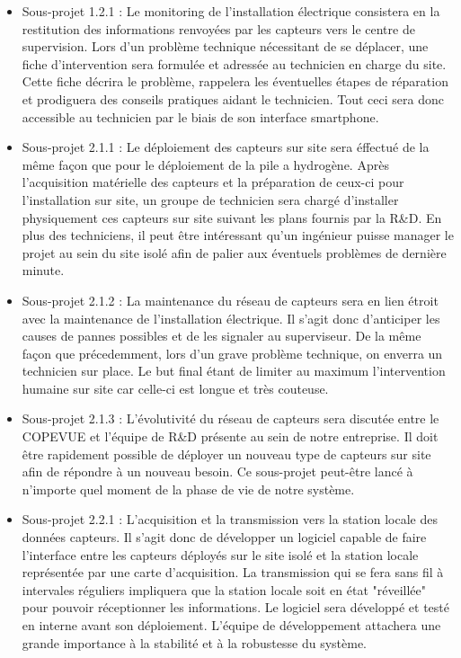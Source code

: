 \begin{itemize}
\item Sous-projet 1.2.1 : Le monitoring de l'installation électrique consistera en la restitution des informations renvoyées par les capteurs vers le centre de supervision. Lors d'un problème technique nécessitant de se déplacer, une fiche d'intervention sera formulée et adressée au technicien en charge du site. Cette fiche décrira le problème, rappelera les éventuelles étapes de réparation et prodiguera des conseils pratiques aidant le technicien. Tout ceci sera donc accessible au technicien par le biais de son interface smartphone.
\medskip
\item Sous-projet 2.1.1 : Le déploiement des capteurs sur site sera éffectué de la même façon que pour le déploiement de la pile a hydrogène. Après l'acquisition matérielle des capteurs et la préparation de ceux-ci pour l'installation sur site, un groupe de technicien sera chargé d'installer physiquement ces capteurs sur site suivant les plans fournis par la R\&D. En plus des techniciens, il peut être intéressant qu'un ingénieur puisse manager le projet au sein du site isolé afin de palier aux éventuels problèmes de dernière minute.
\item Sous-projet 2.1.2 : La maintenance du réseau de capteurs sera en lien étroit avec la maintenance de l'installation électrique. Il s'agit donc d'anticiper les causes de pannes possibles et de les signaler au superviseur. De la même façon que précedemment, lors d'un grave problème technique, on enverra un technicien sur place. Le but final étant de limiter au maximum l'intervention humaine sur site car celle-ci est longue et très couteuse.
\item Sous-projet 2.1.3 : L'évolutivité du réseau de capteurs sera discutée entre le COPEVUE et l'équipe de R\&D présente au sein de notre entreprise. Il doit être rapidement possible de déployer un nouveau type de capteurs sur site afin de répondre à un nouveau besoin. Ce sous-projet peut-être lancé à n'importe quel moment de la phase de vie de notre système.
\item Sous-projet 2.2.1 : L'acquisition et la transmission vers la station locale des données capteurs. Il s'agit donc de développer un logiciel capable de faire l'interface entre les capteurs déployés sur le site isolé et la station locale représentée par une carte d'acquisition. La transmission qui se fera sans fil à intervales réguliers impliquera que la station locale soit en état "réveillée" pour pouvoir réceptionner les informations. Le logiciel sera développé et testé en interne avant son déploiement. L'équipe de développement attachera une grande importance à la stabilité et à la robustesse du système.

\end{itemize}
